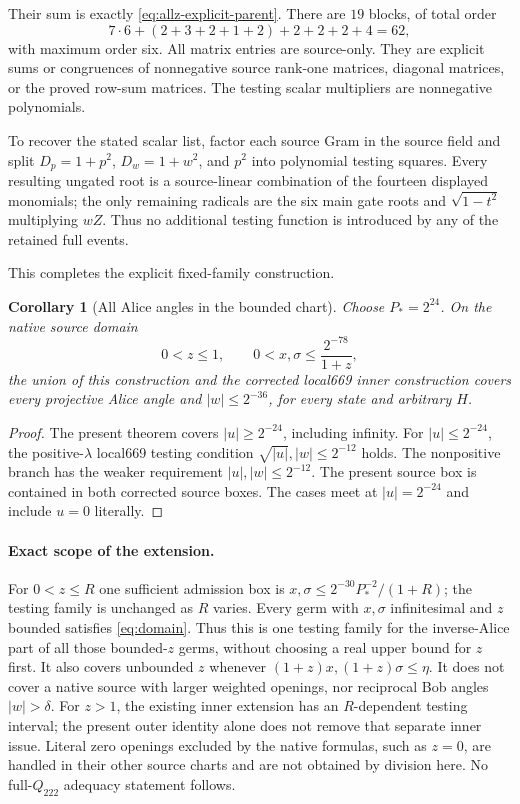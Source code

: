 \documentclass[11pt]{article}
\newtheorem{corollary}{Corollary}
\begin{document}
Their sum is exactly \eqref{eq:allz-explicit-parent}. There are
$19$ blocks, of total order
\[
 7\cdot6+(2+3+2+1+2)+2+2+2+4=62,
\]
with maximum order six. All matrix entries are source-only. They
are explicit sums or congruences of nonnegative source rank-one
matrices, diagonal matrices, or the proved row-sum matrices.
The testing scalar multipliers are nonnegative polynomials.

To recover the stated scalar list, factor each source Gram in the
source field and split $D_p=1+p^2$, $D_w=1+w^2$, and $p^2$ into
polynomial testing squares. Every resulting ungated root is a
source-linear combination of the fourteen displayed monomials;
the only remaining radicals are the six main gate roots and
$\sqrt{1-t^2}$ multiplying $wZ$. Thus no additional testing function
is introduced by any of the retained full events.

This completes the explicit fixed-family construction.

\begin{corollary}[All Alice angles in the bounded chart]\label{cor:alice}
Choose $P_*=2^{24}$. On the native source domain
\[
 0<z\le1,\qquad 0<x,\sigma\le\frac{2^{-78}}{1+z},
\]
the union of this construction and the corrected local669 inner
construction covers every projective Alice angle and
$|w|\le2^{-36}$, for every state and arbitrary $H$.
\end{corollary}
\begin{proof}
The present theorem covers $|u|\ge2^{-24}$, including infinity.
For $|u|\le2^{-24}$, the positive-$\lambda$ local669 testing
condition $\sqrt{|u|},|w|\le2^{-12}$ holds. The nonpositive branch
has the weaker requirement $|u|,|w|\le2^{-12}$. The present source
box is contained in both corrected source boxes. The cases meet at
$|u|=2^{-24}$ and include $u=0$ literally.
\end{proof}

\paragraph{Exact scope of the extension.}
For $0<z\le R$ one sufficient admission box is
$x,\sigma\le2^{-30}P_*^{-2}/(1+R)$; the testing family is unchanged
as $R$ varies. Every germ with $x,\sigma$ infinitesimal and $z$
bounded satisfies \eqref{eq:domain}. Thus this is one testing family
for the inverse-Alice part of all those bounded-$z$ germs, without
choosing a real upper bound for $z$ first. It also covers unbounded
$z$ whenever $(1+z)x,(1+z)\sigma\le\eta$.
It does not cover a native source with larger weighted openings,
nor reciprocal Bob angles $|w|>\delta$. For $z>1$, the existing
inner extension has an $R$-dependent testing interval; the present
outer identity alone does not remove that separate inner issue.
Literal zero openings excluded by the native formulas, such as $z=0$, are handled
in their other source charts and are not obtained by division here.
No full-$Q_{222}$ adequacy statement follows.
\end{document}

